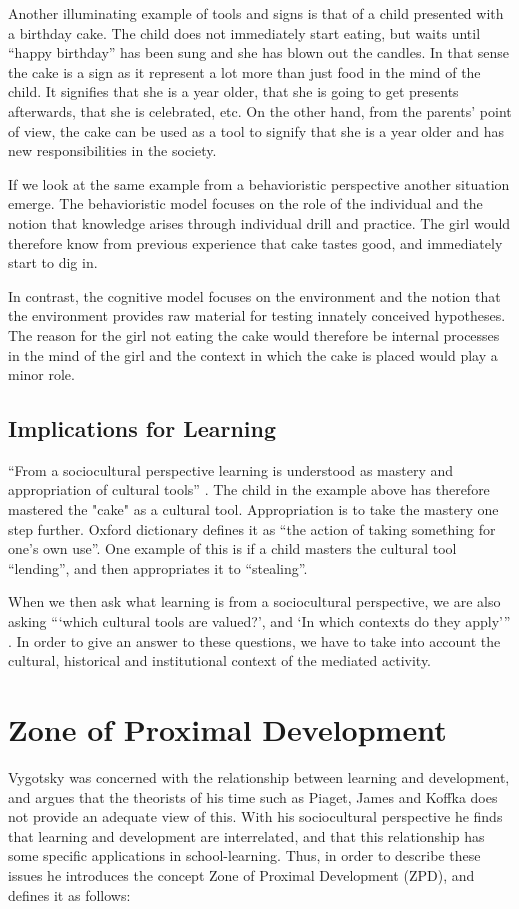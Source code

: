 Another illuminating example of tools and signs is that of a child presented with a birthday cake. The child does not immediately start eating, but waits until “happy birthday” has been sung and she has blown out the candles. In that sense the cake is a sign as it represent a lot more than just food in the mind of the child. It signifies that she is a year older, that she is going to get presents afterwards, that she is celebrated, etc. On the other hand, from the parents’ point of view, the cake can be used as a tool to signify that she is a year older and has new responsibilities in the society. 

If we look at the same example from a behavioristic perspective another situation emerge. The behavioristic model focuses on the role of the individual and the notion that knowledge arises through individual drill and practice. The girl would therefore know from previous experience that cake tastes good, and immediately start to dig in. 

In contrast, the cognitive model focuses on the environment and the notion that the environment provides raw material for testing innately conceived hypotheses. The reason for the girl not eating the cake would therefore be internal processes in the mind of the girl and the context in which the cake is placed would play a minor role. 

\subsection{Implications for Learning}
“From a sociocultural perspective learning is understood as mastery and appropriation of cultural tools” \citetext{Wertsch, 1998, Säljö, 1999, 2001, cited in \citealp{mifsud2010reconsidering}}. The child in the example above has therefore mastered the "cake" as a cultural tool. Appropriation is to take the mastery one step further. Oxford dictionary defines it as “the action of taking something for one’s own use”. One example of this is if a child masters the cultural tool “lending”, and then appropriates it to “stealing”. 

When we then ask what learning is from a sociocultural perspective, we are also asking “‘which cultural tools are valued?’, and ‘In which contexts do they apply’” \citep{mifsud2010reconsidering}. In order to give an answer to these questions, we have to take into account the cultural, historical and institutional context of the mediated activity. 

\section{Zone of Proximal Development}
Vygotsky was concerned with the relationship between learning and development, and argues that the theorists of his time such as Piaget, James and Koffka does not provide an adequate view of this. With his sociocultural perspective he finds that learning and development are interrelated, and that this relationship has some specific applications in school-learning. \citep[p. 84]{vygotskiui1978mind} Thus, in order to describe these issues he introduces the concept Zone of Proximal Development (ZPD), and defines it as follows:

